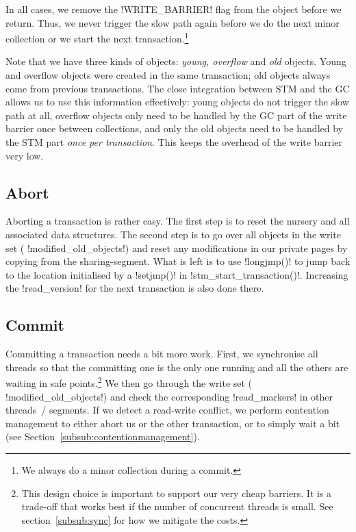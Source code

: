 \documentclass{sigplanconf}
\makeatletter
\renewcommand\lstinline[1][]{%
  \Collectverb{\@@myverb}%
}
\def\@@myverb#1{%
    \begingroup
    \fboxsep=0.2em
    \colorbox{verylightgray}{\oldlstinline|#1|}%
    \endgroup
}
\makeatother
\begin{document}
In all cases, we remove the \lstinline!WRITE_BARRIER!  flag from the
object before we return. Thus, we never trigger the slow path again
before we do the next minor collection or we start the next
transaction.\footnote{We always do a minor collection during a commit.}

Note that we have three kinds of objects: \emph{young, overflow} and
\emph{old} objects. Young and overflow objects were created in the
same transaction; old objects always come from previous transactions.
The close integration between STM and the GC allows us to use this
information effectively: young objects do not trigger the slow path at
all, overflow objects only need to be handled by the GC part of the
write barrier once between collections, and only the old objects need
to be handled by the STM part \emph{once per transaction}. This keeps the
overhead of the write barrier very low.


\subsection{Abort}

Aborting a transaction is rather easy. The first step is to reset the
nursery and all associated data structures. The second step is to go
over all objects in the write set (\lstinline!modified_old_objects!)
and reset any modifications in our private pages by copying from the
sharing-segment. What is left is to use \lstinline!longjmp()!  to jump
back to the location initialised by a \lstinline!setjmp()!  in
\lstinline!stm_start_transaction()!.  Increasing the
\lstinline!read_version! for the next transaction is also done there.




\subsection{Commit}

Committing a transaction needs a bit more work. First, we synchronise
all threads so that the committing one is the only one running and all
the others are waiting in safe points.\footnote{This design choice is
important to support our very cheap barriers. It is a trade-off that
works best if the number of concurrent threads is small.
See section~\ref{subsub:sync} for how we mitigate the costs.}
We then go through the write
set (\lstinline!modified_old_objects!)  and check the corresponding
\lstinline!read_markers!  in other threads~/ segments. If we detect a
read-write conflict, we perform contention management to either abort us or
the other transaction, or to simply wait a bit (see Section~\ref{subsub:contentionmanagement}).
\end{document}
